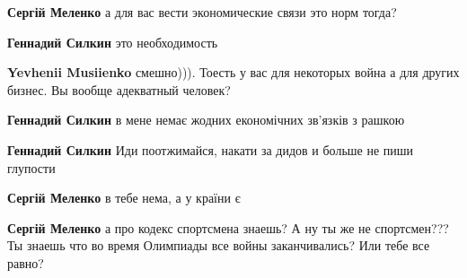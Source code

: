 \begin{itemize}
\begin{itemize}
\begin{itemize}
\textbf{Сергій Меленко} а для вас вести экономические связи это норм тогда?

 
\textbf{Геннадий Силкин} это необходимость

 
\textbf{Yevhenii Musiienko} смешно))). Тоесть у вас для некоторых война а для других бизнес. Вы вообще адекватный человек?

 
\textbf{Геннадий Силкин} в мене немає жодних економічних зв'язків з рашкою

 
\textbf{Геннадий Силкин} Иди поотжимайся, накати за дидов и больше не пиши глупости

 
\textbf{Сергій Меленко} в тебе нема, а у країни є

 
\textbf{Сергій Меленко} а про кодекс спортсмена знаешь? А ну ты же не спортсмен??? Ты знаешь что во время Олимпиады все войны заканчивались? Или тебе все равно?


\end{itemize}
\end{itemize}
\end{itemize}

